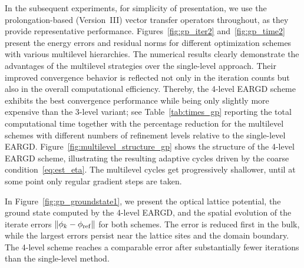 \documentclass[11pt,reqno]{amsart}
\theoremstyle{plain}
\begin{document}
	In the subsequent experiments, for simplicity of presentation, we use the prolongation-based (Version~III) vector transfer operators throughout, as they provide representative performance. Figures~\ref{fig:gp_iter2} and~\ref{fig:gp_time2} present the energy errors and residual norms for different optimization schemes with various multilevel hierarchies. The numerical results clearly demonstrate the advantages of the multilevel strategies over the single-level approach. Their improved convergence behavior is reflected not only in the iteration counts but also in the overall computational efficiency. Thereby, the 4-level EARGD  scheme exhibits the best convergence performance while being only slightly more expensive than the 3-level variant; see Table~\ref{tab:times_gp} reporting the total computational time together with the percentage reduction for the multilevel schemes with different numbers of refinement levels relative to the single-level EARGD.  
	Figure~\ref{fig:multilevel_structure_gp} shows the structure of the  4-level EARGD scheme, illustrating the resulting adaptive cycles driven by the coarse condition~\eqref{eq:est_eta}. The multilevel cycles get progressively shallower, until at some point only regular gradient steps are taken.
	
	
	
	
	In Figure~\ref{fig:gp_groundstate1}, we present the optical lattice potential, the ground state computed by the 4-level EARGD, and the spatial evolution of the iterate errors $\|\phi_k-\phi_{\rm ref}\|$ for both schemes. The error is reduced first in the bulk, while the largest errors persist near the lattice sites and the domain boundary. The 4-level scheme reaches a comparable error after substantially fewer iterations than the single-level method.
	
	
	
\end{document}
